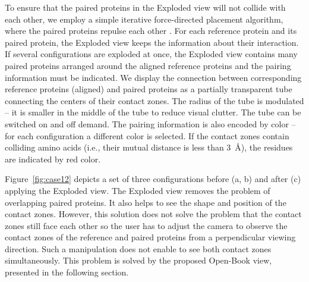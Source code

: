 \documentclass{bmcart}
\def\OpBook {Open-Book view\xspace}
\def\ExpView {Exploded view\xspace}
\begin{document}
To ensure that the paired proteins in the Exploded view will not collide with each other, we employ a simple iterative force-directed placement algorithm, where the paired proteins repulse each other \cite{fruchterman1991graph}.
For each reference protein and its paired protein, the \ExpView keeps the information about their interaction.
If several configurations are exploded at once, the \ExpView contains many paired proteins arranged around the aligned reference proteins and the pairing information must be indicated.
We display the connection between corresponding reference proteins (aligned) and paired proteins as a partially transparent tube connecting the centers of their contact zones.
The radius of the tube is modulated -- it is smaller in the middle of the tube to reduce visual clutter.
The tube can be switched on and off demand.
The pairing information is also encoded by color -- for each configuration a different color is selected.
If the contact zones contain colliding amino acids (i.e., their mutual distance is less than 3~\AA), the residues are indicated by red color.

Figure~\ref{fig:case12} depicts a set of three configurations before (a, b) and after (c) applying the \ExpView.
The Exploded view removes the problem of overlapping paired proteins.
It also helps to see the shape and position of the contact zones.
However, this solution does not solve the problem that the contact zones still face each other so the user has to adjust the camera to observe the contact zones of the reference and paired proteins from a perpendicular viewing direction. 
Such a manipulation does not enable to see both contact zones simultaneously.
This problem is solved by the proposed \OpBook, presented in the following section.
\end{document}
